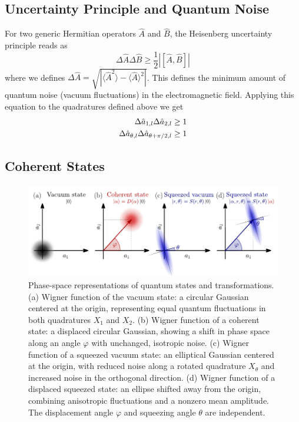 \subsection*{Uncertainty Principle and Quantum Noise}

For two generic Hermitian operators $\hat{A}$ and $\hat{B}$, the Heisenberg uncertainty principle reads as 
\begin{equation}
  \Delta \hat{A}\Delta \hat{B} \geq \frac{1}{2} |[\hat{A}, \hat{B}]|
\end{equation}
where we defines $\Delta \hat{A}=\sqrt{|\langle \hat{A}^2\rangle - \langle \hat{A} \rangle^2|}$. This defines the minimum amount of quantum noise (vacuum fluctuations) in the electromagnetic field.
Applying this equation to the quadratures defined above we get 
\begin{equation}
   \begin{split}
    \Delta \hat{a}_{1,l} \Delta \hat{a}_{2,l} &\geq 1 \\
    \Delta \hat{a}_{\theta \vphantom{\pi/2},l} \Delta \hat{a}_{\theta +\pi/2,l} &\geq 1
   \end{split}
\end{equation}
\subsection*{Coherent States}


\begin{figure}
\centering
\includegraphics[width=\textwidth]{./chap2/fig/quantumstates (2).pdf}
\caption{Phase-space representations of quantum states and transformations.
(a) Wigner function of the vacuum state: a circular Gaussian centered at the origin, representing equal quantum fluctuations in both quadratures $X_1$ and $X_2$.
(b) Wigner function of a coherent state: a displaced circular Gaussian, showing a shift in phase space along an angle $\varphi$ with unchanged, isotropic noise.
(c) Wigner function of a squeezed vacuum state: an elliptical Gaussian centered at the origin, with reduced noise along a rotated quadrature $X_\theta$ and increased noise in the orthogonal direction.
(d) Wigner function of a displaced squeezed state: an ellipse shifted away from the origin, combining anisotropic fluctuations and a nonzero mean amplitude. The displacement angle $\varphi$ and squeezing angle $\theta$ are independent.} 
\end{figure}

